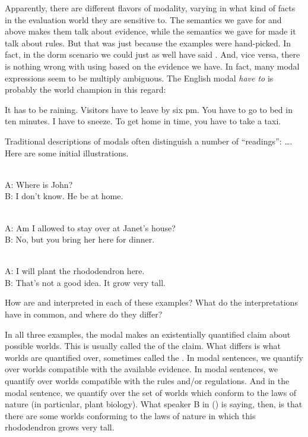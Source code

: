 Apparently, there are different flavors of modality, varying in what kind of
facts in the evaluation world they are sensitive to. The semantics we gave for
 and  above makes them talk about evidence,
while the semantics we gave for  made it talk about rules.
But that was just because the examples were hand-picked. In fact, in the dorm
scenario we could just as well have said . And,
vice versa, there is nothing wrong with using  based on the evidence we have. In fact, many modal expressions
seem to be multiply ambiguous. The English modal \emph{have to} is probably the
world champion in this regard:

\pex\label{ex:poly-have}
\a It has to be raining.
\a Visitors have to leave by six pm.
\a You have to go to bed in ten minutes.
\a I have to sneeze.
\a To get home in time, you have to take a taxi.
\xe

%
Traditional descriptions of modals often distinguish a number of ``readings'':
 \dots. Here are
some initial illustrations.

\ex \label{epist}\\[6pt]
A: Where is John?\\
B: I don't know. He  be at home. \xe

\ex {}\\[6pt]
A: Am I allowed to stay over at Janet's house?\\
B: No, but you  bring her here for dinner. \xe

\ex {}\\[6pt]
A: I will plant the rhododendron here.\\
B: That's not a good idea. It  grow very tall. \xe

How are  and  interpreted in each of these
examples? What do the interpretations have in common, and where do they differ?

In all three examples, the modal makes an existentially quantified claim about
possible worlds. This is usually called the  of the claim.
What differs is what worlds are quantified over, sometimes called the
. In  modal sentences, we quantify over
worlds compatible with the available evidence. In  modal
sentences, we quantify over worlds compatible with the rules and/or regulations.
And in the  modal sentence, we quantify over the set of
worlds which conform to the laws of nature (in particular, plant biology). What
speaker B in (\lastx) is saying, then, is that there are some worlds conforming
to the laws of nature in which this rhododendron grows very tall.

